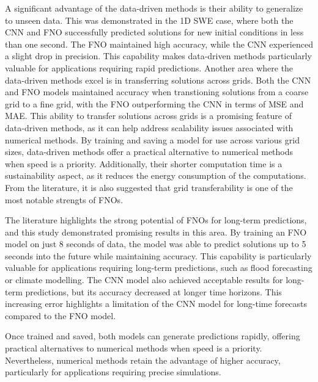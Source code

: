A significant advantage of the data-driven methods is their ability to generalize to unseen data.
This was demonstrated in the 1D SWE case, where both the CNN and FNO successfully predicted solutions for new initial conditions in less than one second.
The FNO maintained high accuracy, while the CNN experienced a slight drop in precision.
This capability makes data-driven methods particularly valuable for applications requiring rapid predictions.
Another area where the data-driven methods excel is in transferring solutions across grids.
Both the CNN and FNO models maintained accuracy when transtioning solutions from a coarse grid to a fine grid, with the FNO outperforming the CNN in terms of MSE and MAE.
This ability to transfer solutions across grids is a promising feature of data-driven methods, as it can help address scalability issues associated with numerical methods.
By training and saving a model for use across various grid sizes, data-driven methods offer a practical alternative to numerical methods when speed is a priority.
Additionally, their shorter computation time is a sustainability aspect, as it reduces the energy consumption of the computations.
From the literature, it is also suggested that grid transferability is one of the most notable strengts of FNOs.

The literature highlights the strong potential of FNOs for long-term predictions, and this study demonstrated promising results in this area.
By training an FNO model on just 8 seconds of data, the model was able to predict solutions up to 5 seconds into the future while maintaining accuracy.
This capability is particularly valuable for applications requiring long-term predictions, such as flood forecasting or climate modelling.
The CNN model also achieved acceptable results for long-term predictions, but its accuracy decreased at longer time horizons.
This increasing error highlights a limitation of the CNN model for long-time forecasts compared to the FNO model.

Once trained and saved, both models can generate predictions rapidly, offering practical alternatives to numerical methods when speed is a priority.
Nevertheless, numerical methods retain the advantage of higher accuracy, particularly for applications requiring precise simulations.

